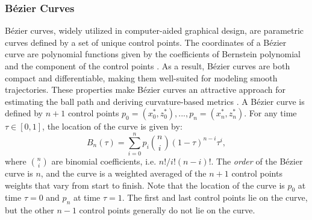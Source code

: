 \documentclass{article}
\begin{document}
        \subsubsection{Bézier Curves}

            Bézier curves, widely utilized in computer-aided graphical design, are parametric curves defined by a set of unique control points. The coordinates of a Bézier curve are polynomial functions given by the coefficients of Bernstein polynomial and the component of the control points \citep{baydas_defining_2019}. As a result, Bézier curves are both compact and differentiable, making them well-suited for modeling smooth trajectories. These properties make Bézier curves an attractive approach for estimating the ball path and deriving curvature-based metrics \citep{slegers_role_2024}. A Bézier curve is defined by \(n + 1\) control points \(p_0 = (x_0^*, z_0^*), ..., p_n = (x_n^*, z_n^*)\). For any time \(\tau \in [0, 1]\), the location of the curve is given by:
            \begin{equation}
              \label{eqn:bezier}
              B_n(\tau) = \sum_{i=0}^{n} p_i \binom{n}{i} (1 - \tau)^{n-i} \tau^i,
            \end{equation}
            where \( \binom{n}{i} \) are binomial coefficients, i.e. $n! / i! (n - i)!$. The {\it order} of the Bézier curve is \(n\), and the curve is a weighted averaged of the \(n+1\) control points weights that vary from start to finish. Note that the location of the curve is \(p_0\) at time \(\tau =0\) and \(p_n\) at time \(\tau=1\). The first and last control points lie on the curve, but the other \(n - 1\) control points generally do not lie on the curve.
\end{document}

